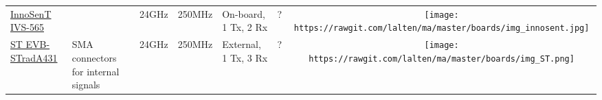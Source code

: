 \begin{longtable}[]{@{}llllllc@{}}
\begin{minipage}[t]{0.09\columnwidth}\raggedright\strut
	\href{http://www.innosent.de/fileadmin/media/dokumente/DATASHEETS_2016/Datenblatt_IVS-565.pdf}{InnoSenT IVS-565}
\strut\end{minipage} &
\begin{minipage}[t]{0.13\columnwidth}\raggedright\strut

\strut\end{minipage} &
\begin{minipage}[t]{0.09\columnwidth}\raggedright\strut
24GHz
\strut\end{minipage} &
\begin{minipage}[t]{0.11\columnwidth}\raggedright\strut
250MHz
\strut\end{minipage} &
\begin{minipage}[t]{0.10\columnwidth}\raggedright\strut
On-board, 1 Tx, 2 Rx
\strut\end{minipage} &
\begin{minipage}[t]{0.15\columnwidth}\raggedright\strut
?
\strut\end{minipage} &
\begin{minipage}[t]{0.10\columnwidth}\centering\strut
\texttt{[image: https://rawgit.com/lalten/ma/master/boards/img\_innosent.jpg]}
\strut\end{minipage}\tabularnewline

\begin{minipage}[t]{0.09\columnwidth}\raggedright\strut
	\href{http://www.st.com/content/st_com/en/products/evaluation-tools/product-evaluation-tools/automotive-ic-eval-boards/evb-strada431.html}{ST EVB-STradA431}
\strut\end{minipage} &
\begin{minipage}[t]{0.13\columnwidth}\raggedright\strut
SMA connectors for internal signals
\strut\end{minipage} &
\begin{minipage}[t]{0.09\columnwidth}\raggedright\strut
24GHz
\strut\end{minipage} &
\begin{minipage}[t]{0.11\columnwidth}\raggedright\strut
250MHz
\strut\end{minipage} &
\begin{minipage}[t]{0.10\columnwidth}\raggedright\strut
External, 1 Tx, 3 Rx
\strut\end{minipage} &
\begin{minipage}[t]{0.15\columnwidth}\raggedright\strut
?
\strut\end{minipage} &
\begin{minipage}[t]{0.10\columnwidth}\centering\strut
\texttt{[image: https://rawgit.com/lalten/ma/master/boards/img\_ST.png]}
\strut\end{minipage}\tabularnewline


\end{longtable}
